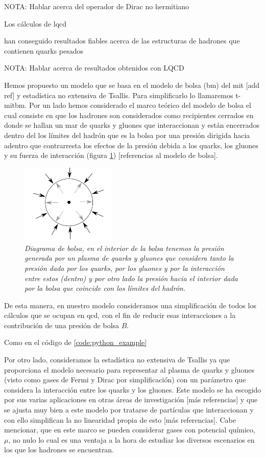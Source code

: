 NOTA: Hablar acerca del operador de Dirac no hermitiano

Los cálculos de \acrshort{lqcd} 

han conseguido resultados fiables acerca de las estructuras de hadrones que contienen quarks pesados


NOTA: Hablar acerca de resultados obtenidos con LQCD

Hemos propuesto un modelo que se basa en el modelo de bolsa (\acrshort{bm}) del \acrfull{mit} [add ref] y estadística no extensiva de Tsallis. Para simplificarlo lo llamaremos \acrshort{t-mitbm}. Por un lado hemos considerado el marco teórico del modelo de bolsa el cual consiste en que los hadrones son considerados como recipientes cerrados en donde se hallan un mar de quarks y gluones que interaccionan y están encerrados dentro del los límites del hadrón que es la bolsa por una presión dirigida hacia adentro que contrarresta los efectos de la presión debida a los quarks, los gluones y su fuerza de interacción (figura \ref{fig: Bolsa}) [referencias al modelo de bolsa]. 

\begin{figure}
\centering
\includegraphics[width=0.4\textwidth]{./Images/Bag model.png}
\caption[Diagrama de bolsa]{\emph{Diagrama de bolsa, en el interior de la bolsa tenemos la presión generada por un plasma de quarks y gluones que considera tanto la presión dada por los quarks, por los gluones y por la interacción entre estos (dentro) y por otro lado la presión hacia el interior dada por la bolsa que coincide con los límites del hadrón.}}
\label{fig: Bolsa}
\end{figure}

De esta manera, en nuestro modelo consideramos una simplificación de todos los cálculos que se ocupan en \acrshort{qcd}, con el fin de reducir esas interacciones a la contribución de una presión de bolsa $B$.

Como en el código de \ref{code:python_example}

Por otro lado, consideramos la estadística no extensiva de Tsallis ya que proporciona el modelo necesario para representar al plasma de quarks y gluones (visto como gases de Fermi y Dirac por simplificación) con un parámetro que considera la interacción entre los quarks y los gluones. Este modelo se ha escogido por sus varias aplicaciones en otras áreas de investigación [más referencias] y que se ajusta muy bien a este modelo por tratarse de partículas que interaccionan y con ello simplifican la no linearidad propia de esto [más referencias]. Cabe mencionar, que en este marco se pueden considerar gases con potencial químico, $\mu$, no nulo lo cual es una ventaja a la hora de estudiar los diversos escenarios en los que los hadrones se encuentran.

